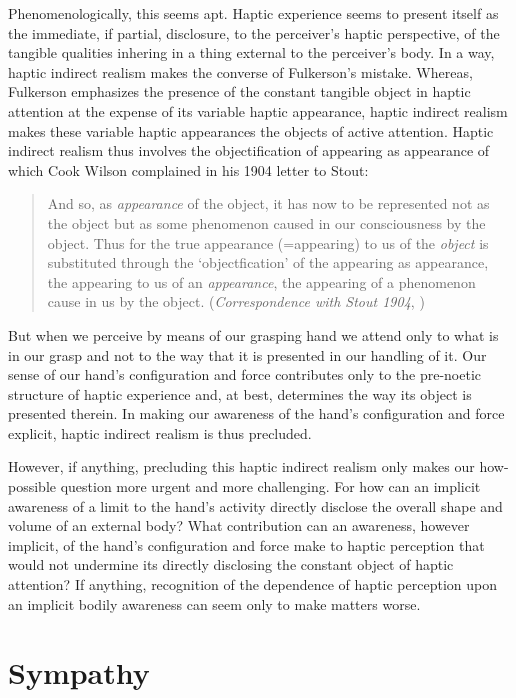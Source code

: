 Phenomenologically, this seems apt. Haptic experience seems to present itself as the immediate, if partial, disclosure, to the perceiver's haptic perspective, of the tangible qualities inhering in a thing external to the perceiver's body. In a way, haptic indirect realism makes the converse of Fulkerson's mistake. Whereas, Fulkerson emphasizes the presence of the constant tangible object in haptic attention at the expense of its variable haptic appearance, haptic indirect realism makes these variable haptic appearances the objects of active attention. Haptic indirect realism thus involves the objectification of appearing as appearance of which Cook Wilson complained in his 1904 letter to Stout:
\begin{quote}
	And so, as \emph{appearance} of the object, it has now to be represented not as the object but as some phenomenon caused in our consciousness by the object. Thus for the true appearance (=appearing) to us of the \emph{object} is substituted through the `objectfication’ of the appearing as appearance, the appearing to us of an \emph{appearance}, the appearing of a phenomenon cause in us by the object. (\emph{Correspondence with Stout 1904}, \citealt[796]{Cook-Wilson:1926sf})
\end{quote}
But when we perceive by means of our grasping hand we attend only to what is in our grasp and not to the way that it is presented in our handling of it. Our sense of our hand's configuration and force contributes only to the pre-noetic structure of haptic experience and, at best, determines the way its object is presented therein. In making our awareness of the hand's configuration and force explicit, haptic indirect realism is thus precluded. 

However, if anything, precluding this haptic indirect realism only makes our how-possible question more urgent and more challenging. For how can an implicit awareness of a limit to the hand's activity directly disclose the overall shape and volume of an external body? What contribution can an awareness, however implicit, of the hand's configuration and force make to haptic perception that would not undermine its directly disclosing the constant object of haptic attention? If anything, recognition of the dependence of haptic perception upon an implicit bodily awareness can seem only to make matters worse.


\section{Sympathy} %
\label{sec:sympathy_and_haptic_perception}

